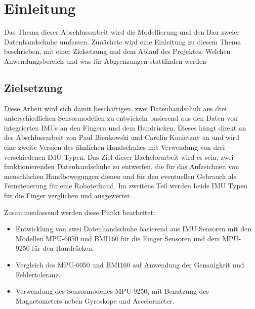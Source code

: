 \chapter{Einleitung}

Das Thema dieser Abschlussarbeit wird die Modellierung und den Bau zweier Datenhandschuhe umfassen. Zunächste wird eine Einleitung zu diesem  Thema beschrieben, mit einer Zielsetzung und dem Ablauf des Projektes. Welchen Anwendungsbereich und was für  Abgrenzungen stattfinden werden

\section{Zielsetzung}
Diese Arbeit wird sich damit beschäftigen, zwei Datenhandschuh aus drei unterschiedlichen Sensormodellen zu entwickeln basierend aus den Daten von integrierten IMUs an den Fingern und dem Handrücken. Dieses hängt direkt an der Abschlussarbeit von Paul Bienkowski und Carolin Konietzny an und wird eine zweite Version des ähnlichen Handschuhes mit Verwendung von drei verschiedenen IMU Typen. Das Ziel dieser Bachelorarbeit wird es sein, zwei funktionierenden Datenhandschuhe zu entwerfen, die für das Aufzeichnen von menschlichen Handbewegungen dienen und für den eventuellen Gebrauch als Fernsteuerung für eine Roboterhand. Im zweitens Teil werden beide IMU Typen für die Finger verglichen und ausgewertet.

Zusammenfassend werden diese Punkt bearbeitet:
\begin{itemize}
\item Entwicklung von zwei Datenhandschuhe basierend aus IMU Sensoren mit den Modellen MPU-6050 und BMI160 für die Finger Sensoren und dem MPU-9250 für den Handrücken.

\item Vergleich des MPU-6050 und BMI160 auf Anwendung der Genauigkeit und Fehlertoleranz. 

\item Verwendung des Sensormodelles MPU-9250, mit Benutzung des Magnetometers neben Gyroskope und Accelormeter.

\end{itemize}

